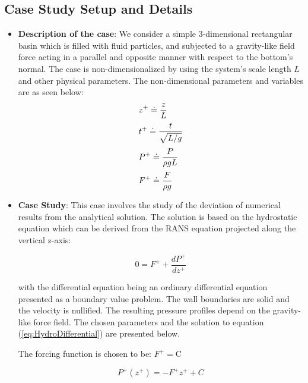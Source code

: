 \documentclass{../GPUSPHtemplate}
\begin{document}
\subsection{Case Study Setup and Details}
\vspace*{2pt}
\begin{itemize}
\item \textbf{Description of the case}: We consider a simple 3-dimensional rectangular basin which is
  filled with fluid particles, and subjected to a gravity-like field force acting in a parallel and
  opposite manner with respect to the bottom's normal. The case is non-dimensionalized by using the system's scale length $L$
  and other physical parameters. The non-dimensional parameters and variables are as seen below:   
  \begin{equation}
    \begin{array}{l}
      \displaystyle{  z^{+} \doteq \frac{z}{L} } \medskip \\ 
      \displaystyle{  t^{+} \doteq \frac{t}{\sqrt{L/g}} } \medskip \\ 
      \displaystyle{  P^{+} \doteq \frac{P}{\rho gL} } \medskip \\ 
      \displaystyle{  F^{+} \doteq \frac{F}{\rho g} } 
    \end{array}
  \end{equation}  
  
\item \textbf{Case Study}:  This case involves the study of the deviation of numerical results
  from the analytical solution. The solution is based on the hydrostatic equation which can be
  derived from the RANS equation projected along the vertical z-axis: 
  
  \begin{equation}\label{eq:HydroDifferential}
    0 = F^{+}+ \frac{d P^+}{d z^+}
  \end{equation}
  
  with the differential equation being an ordinary differential equation presented as a boundary value problem.
  The wall boundaries are solid and the velocity is nullified. The resulting pressure profiles
  depend on the gravity-like force field. The chosen parameters and
  the solution to equation (\ref{eq:HydroDifferential}) are presented below.
  
  The forcing function is chosen to be: $ F^+ = \text{C}  $  
    
  \begin{equation}\label{eq:HydroStatic}
    P^+(z^+) =  -F^{+} z^+  + C
  \end{equation}
  

\end{itemize}
\end{document}
